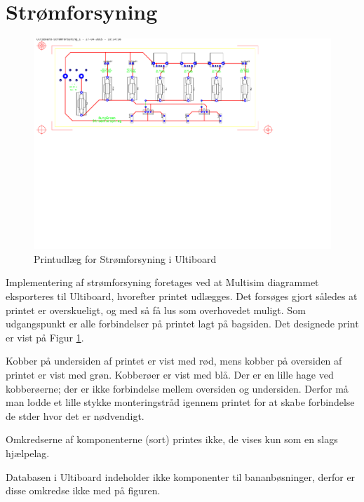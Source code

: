 \section{Strømforsyning} \label{sec:PsuImpl}

\begin{figure}[h]
\centering 
\includegraphics[width={\textwidth+2.9cm}, trim=55 345 210 25, clip=true, angle =90] {../fig/ultiboard_stroemforsyning.pdf}
\caption{Printudlæg for Strømforsyning i Ultiboard}
\label{fig:ultiboard_stroemforsyning}
\end{figure}

\clearpage

Implementering af strømforsyning foretages ved at Multisim diagrammet eksporteres til Ultiboard, hvorefter printet udlægges.
Det forsøges gjort således at printet er overskueligt, og med så få lus som overhovedet muligt. 
Som udgangspunkt er alle forbindelser på printet lagt på bagsiden. 
Det designede print er vist på Figur \ref{fig:ultiboard_stroemforsyning}. 

Kobber på undersiden af printet er vist med rød, mens kobber på oversiden af printet er vist med grøn. 
Kobberøer er vist med blå.
Der er en lille hage ved kobberøerne; der er ikke forbindelse mellem oversiden og undersiden. 
Derfor må man lodde et lille stykke monteringstråd igennem printet for at skabe forbindelse de stder hvor det er nødvendigt. 

Omkredserne af komponenterne (sort) printes ikke, de vises kun som en slags hjælpelag. 

Databasen i Ultiboard indeholder ikke komponenter til bananbøsninger, derfor er disse omkredse ikke med på figuren. 

